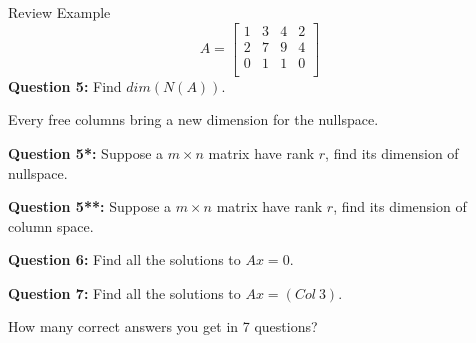 \documentclass{beamer}
\begin{document}
\begin{frame}{Review Example}
\begin{equation*}
    A=\left[ \begin{matrix}
        1&		3&		4&		2\\
        2&		7&		9&		4\\
        0&		1&		1&		0\\
    \end{matrix} \right]
\end{equation*}
\textbf{Question 5:} Find $dim(N(A))$.

\vspace{3pt}
Every free columns bring a new dimension for the nullspace.

\vspace{5pt}
\textbf{Question 5*:} Suppose a $m \times n$ matrix have rank $r$, find its dimension of nullspace.

\vspace{5pt}
\textbf{Question 5**:} Suppose a $m \times n$ matrix have rank $r$, find its dimension of column space.

\vspace{5pt}
\textbf{Question 6:} Find all the solutions to $Ax=0$.

\vspace{5pt}
\textbf{Question 7:} Find all the solutions to $Ax=(Col\:3)$.

\vspace{3pt}
How many correct answers you get in 7 questions?
\end{frame}
\end{document}
